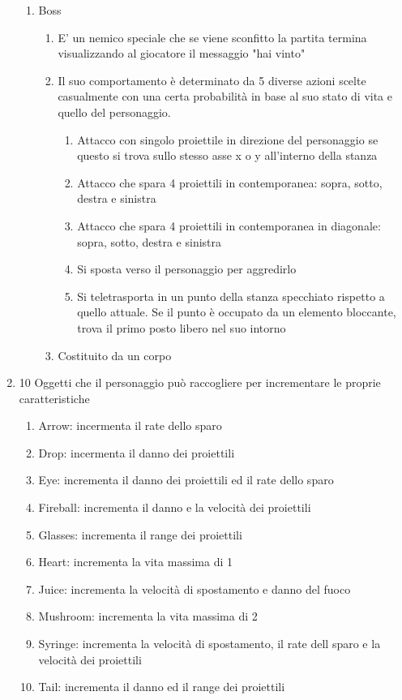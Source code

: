 \begin{enumerate}
\begin{enumerate}
        \item Boss
        \begin{enumerate}
            \item E' un nemico speciale che se viene sconfitto la partita termina visualizzando al giocatore il messaggio "hai vinto"
            \item Il suo comportamento è determinato da 5 diverse azioni scelte casualmente con una certa probabilità in base al suo stato di vita e quello del personaggio.
            \begin{enumerate}
				\item Attacco con singolo proiettile in direzione del personaggio se questo si trova sullo stesso asse x o y all'interno della stanza
				\item Attacco che spara 4 proiettili in contemporanea: sopra, sotto, destra e sinistra
				\item Attacco che spara 4 proiettili in contemporanea in diagonale: sopra, sotto, destra e sinistra
				\item Si sposta verso il personaggio per aggredirlo
				\item Si teletrasporta in un punto della stanza specchiato rispetto a quello attuale. Se il punto è occupato da un elemento bloccante, trova il primo posto libero nel suo intorno
			\end{enumerate}
            \item Costituito da un corpo
        \end{enumerate}
    \end{enumerate}
    
    \item 10 Oggetti che il personaggio può raccogliere per incrementare le proprie caratteristiche
    \begin{enumerate}
        \item Arrow: incermenta il rate dello sparo 
        \item Drop: incermenta il danno dei proiettili
        \item Eye: incrementa il danno dei proiettili ed il rate dello sparo
        \item Fireball: incrementa il danno e la velocità dei proiettili
        \item Glasses: incrementa il range dei proiettili
        \item Heart: incrementa la vita massima di 1
        \item Juice: incrementa la velocità di spostamento e danno del fuoco
        \item Mushroom: incrementa la vita massima di 2
		\item Syringe: incrementa la velocità di spostamento, il rate dell sparo e la velocità dei proiettili
		\item Tail: incrementa il danno ed il range dei proiettili
    \end{enumerate}
         
\end{enumerate}


